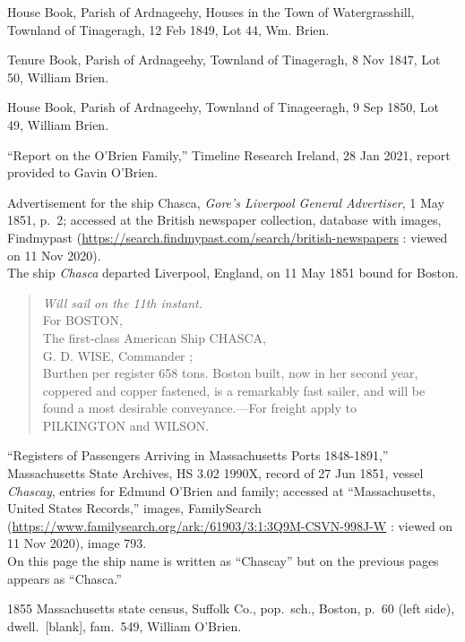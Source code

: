 \begin{thebibliography}{999}
House Book, Parish of Ardnageehy, Houses in the Town of Watergrasshill, Townland of Tinageragh, 12 Feb 1849, Lot 44, Wm. Brien.

Tenure Book, Parish of Ardnageehy, Townland of Tinageragh, 8 Nov 1847, Lot 50, William Brien.

House Book, Parish of Ardnageehy, Townland of Tinageeragh, 9 Sep 1850, Lot 49, William Brien.

``Report on the O'Brien Family,'' Timeline Research Ireland, 28 Jan 2021, report provided to Gavin O'Brien.

Advertisement for the ship Chasca, \textit{Gore's Liverpool General Advertiser}, 1 May 1851, p.\ 2; accessed at the British newspaper collection, database with images, Findmypast (\url{https://search.findmypast.com/search/british-newspapers} : viewed on 11 Nov 2020).\\
The ship \textit{Chasca} departed Liverpool, England, on 11 May 1851 bound for Boston. 
\begin{quote}
	\textit{Will sail on the 11th instant.}\\
	For BOSTON,\\
	The first-class American Ship CHASCA,\\
	G. D. WISE, Commander ;\\
	Burthen per register 658 tons. Boston built, now in her second year, coppered and copper fastened, is a remarkably fast sailer, and will be found a most desirable conveyance.---For freight apply to\\
	PILKINGTON and WILSON.
\end{quote}

``Registers of Passengers Arriving in Massachusetts Ports 1848-1891,'' Massachusetts State Archives, HS 3.02 1990X, record of 27 Jun 1851, vessel \textit{Chascay}, entries for Edmund O'Brien and family; accessed at ``Massachusetts, United States Records,'' images, FamilySearch (\url{https://www.familysearch.org/ark:/61903/3:1:3Q9M-CSVN-998J-W} : viewed on 11 Nov 2020), image 793.\\
On this page the ship name is written as ``Chascay'' but on the previous pages appears as ``Chasca.''

1855 Massachusetts state census, Suffolk Co., pop.\ sch., Boston, p.\ 60 (left side), dwell.\ [blank], fam.\ 549,  William O'Brien.


\end{thebibliography}

